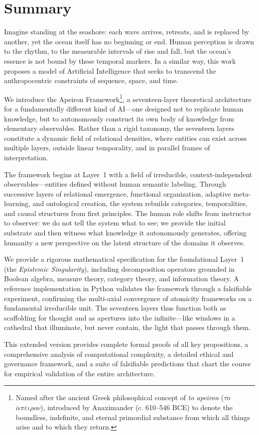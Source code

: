 \chapter*{Summary}

Imagine standing at the seashore: each wave arrives, retreats, and is replaced by another, yet the ocean itself has no beginning or end. Human perception is drawn to the rhythm, to the measurable intervals of rise and fall, but the ocean's essence is not bound by these temporal markers. In a similar way, this work proposes a model of Artificial Intelligence that seeks to transcend the anthropocentric constraints of sequence, space, and time.

We introduce the Apeiron Framework\footnote{Named after the ancient Greek philosophical concept of \textit{to apeiron} ($\tau\grave{o}$ $\ddot{\alpha}\pi\varepsilon\iota\rho o\nu$), introduced by Anaximander (c. 610--546 BCE) to denote the boundless, indefinite, and eternal primordial substance from which all things arise and to which they return.}, a seventeen-layer theoretical architecture for a fundamentally different kind of AI---one designed not to replicate human knowledge, but to autonomously construct its own body of knowledge from elementary observables. Rather than a rigid taxonomy, the seventeen layers constitute a dynamic field of relational densities, where entities can exist across multiple layers, outside linear temporality, and in parallel frames of interpretation.

The framework begins at Layer~1 with a field of irreducible, context-independent observables---entities defined without human semantic labeling. Through successive layers of relational emergence, functional organization, adaptive meta-learning, and ontological creation, the system rebuilds categories, temporalities, and causal structures from first principles. The human role shifts from instructor to observer: we do not tell the system what to see; we provide the initial substrate and then witness what knowledge it autonomously generates, offering humanity a new perspective on the latent structure of the domains it observes.

We provide a rigorous mathematical specification for the foundational Layer~1 (the \textit{Epistemic Singularity}), including decomposition operators grounded in Boolean algebra, measure theory, category theory, and information theory. A reference implementation in Python validates the framework through a falsifiable experiment, confirming the multi-axial convergence of atomicity frameworks on a fundamental irreducible unit. The seventeen layers thus function both as scaffolding for thought and as apertures into the infinite---like windows in a cathedral that illuminate, but never contain, the light that passes through them.

This extended version provides complete formal proofs of all key propositions, a comprehensive analysis of computational complexity, a detailed ethical and governance framework, and a suite of falsifiable predictions that chart the course for empirical validation of the entire architecture.